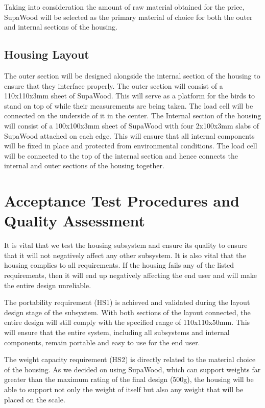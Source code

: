 \documentclass[class=report,11pt,crop=false]{standalone}
\begin{document}
Taking into consideration the amount of raw material obtained for the price, SupaWood will be selected as the primary material of choice for both the outer and internal sections of the housing.

\subsection{Housing Layout}
The outer section will be designed alongside the internal section of the housing to ensure that they interface properly. The outer section will consist of a 110x110x3mm sheet of SupaWood. This will serve as a platform for the birds to stand on top of while their measurements are being taken. The load cell will be connected on the underside of it in the center. The Internal section of the housing will consist of a 100x100x3mm sheet of SupaWood with four 2x100x3mm slabs of SupaWood attached on each edge. This will ensure that all internal components will be fixed in place and protected from environmental conditions. The load cell will be connected to the top of the internal section and hence connects the internal and outer sections of the housing together. 

\section{Acceptance Test Procedures and Quality Assessment}
It is vital that we test the housing subsystem and ensure its quality to ensure that it will not negatively affect any other subsystem. It is also vital that the housing complies to all requirements. If the housing fails any of the listed requirements, then it will end up negatively affecting the end user and will make the entire design unreliable. 

The portability requirement (HS1) is achieved and validated during the layout design stage of the subsystem. With both sections of the layout connected, the entire design will still comply with the specified range of 110x110x50mm. This will ensure that the entire system, including all subsystems and internal components, remain portable and easy to use for the end user.

The weight capacity requirement (HS2) is directly related to the material choice of the housing. As we decided on using SupaWood, which can support weights far greater than the maximum rating of the final design (500g), the housing will be able to support not only the weight of itself but also any weight that will be placed on the scale.
\end{document}
